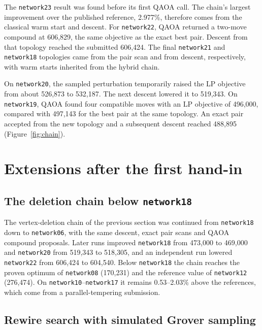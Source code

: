 \documentclass[a4paper]{article}
\begin{document}
The \texttt{network23} result was found before its first QAOA call. The chain's largest improvement over the
published reference, 2.977\%, therefore comes from the classical warm start and descent.
For \texttt{network22}, QAOA returned a two-move compound at 606,829, the same objective as the exact best pair.
Descent from that topology reached the submitted 606,424. The final \texttt{network21} and \texttt{network18}
topologies came from the pair scan and from descent, respectively, with warm starts inherited from the hybrid chain.

On \texttt{network20}, the sampled perturbation temporarily raised the LP objective from about 526,873 to 532,187.
The next descent lowered it to 519,343. On \texttt{network19}, QAOA found four compatible moves with an LP
objective of 496,000, compared with 497,143 for the best pair at the same topology. An exact pair accepted
from the new topology and a subsequent descent reached 488,895 (Figure~\ref{fig:chain}).

\clearpage
\section{Extensions after the first hand-in}

\subsection{The deletion chain below \texttt{network18}}

The vertex-deletion chain of the previous section was continued from \texttt{network18} down to \texttt{network06},
with the same descent, exact pair scans and QAOA compound proposals. Later runs improved \texttt{network18} from 473,000 to 469,000
and \texttt{network20} from 519,343 to 518,305, and an independent run lowered \texttt{network22} from 606,424 to 604,540.
Below \texttt{network18} the chain reaches the proven optimum of \texttt{network08} (170,231) and the reference value of
\texttt{network12} (276,474). On \texttt{network10}--\texttt{network17} it remains 0.53--2.03\% above the references,
which come from a parallel-tempering submission.

\subsection{Rewire search with simulated Grover sampling}
\end{document}
